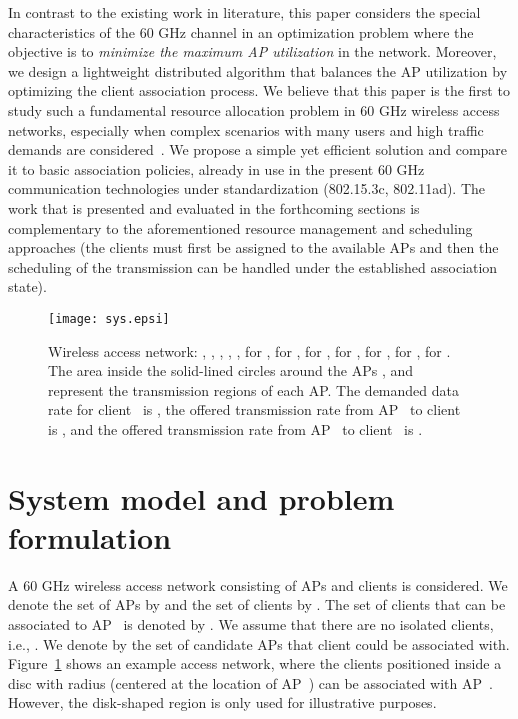 \documentclass[journal, 10pt, twocolumn]{IEEEtran}
\begin{document}
In contrast to the existing work in literature, this paper considers the special characteristics of the 60 GHz channel in an optimization problem where the objective is to \emph{minimize the maximum AP utilization} in the network. Moreover, we design a lightweight distributed algorithm that balances the AP utilization by optimizing the client association process. We believe that this paper is the first to study such a fundamental resource allocation problem in 60 GHz wireless access networks, especially when complex scenarios with many users and high traffic demands are considered~\cite{Hoydis11, Lee12}. We propose a simple yet efficient solution and compare it to basic association policies, already in use in the present 60 GHz communication technologies under standardization (802.15.3c, 802.11ad). The work that is presented and evaluated in the forthcoming sections is complementary to the aforementioned resource management and scheduling approaches (the clients must first be assigned to the available APs and then the scheduling of the transmission can be handled under the established association state).

\begin{figure}[t]
\centering
\texttt{[image: sys.epsi]}\vspace{-2mm}
\caption{Wireless access network: , , , , ,  for ,  for ,  for ,  for ,  for ,  for ,  for . The area inside the solid-lined circles around the APs , and  represent the transmission regions of each AP. The demanded data rate for client~ is , the offered transmission rate from AP~ to client~ is , and the offered transmission rate from AP~ to client~ is .}
\label{fig:system_example}
\vspace{-4.0mm}
\end{figure}

\section{System model and problem formulation}\label{sec:SysModel_mini_max_primal_problem}

A 60 GHz wireless access network consisting of  APs and  clients is considered. We denote the set of APs by  and the set of clients by .
The set of clients that can be associated to AP~ is denoted by . We assume that there are no isolated clients, i.e., . We denote by  the set of candidate APs that client  could be associated with. Figure~\ref{fig:system_example} shows an example access network, where the clients positioned inside a disc with radius  (centered at the location of AP~) can be associated with AP~. However, the disk-shaped region is only used for illustrative purposes. 
\end{document}

